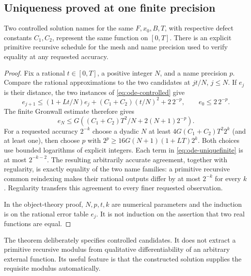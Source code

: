 \subsection{Uniqueness proved at one finite precision}

\begin{theorem}
\label{thm:ode-unique}
Two controlled solution names for the same $F,x_0,B,T$, with respective
defect constants $C_1,C_2$, represent the same function on $[0,T]$.
There is an explicit primitive recursive schedule for the mesh and name
precision used to verify equality at any requested accuracy.
\end{theorem}
\begin{proof}
Fix a rational $t\in[0,T]$, a positive integer $N$, and a name precision
$p$.  Compare the rational approximations to the two candidates at
$jt/N$, $j\le N$.  If $e_j$ is their distance, the two instances of
\eqref{eq:ode-controlled} give
\[
 e_{j+1}\le(1+Lt/N)e_j+(C_1+C_2)(t/N)^2+2\,2^{-p},
 \qquad e_0\le2\,2^{-p}.
\]
The finite Gronwall estimate therefore gives
\begin{equation}
 e_N\le G\left((C_1+C_2)T^2/N+2(N+1)2^{-p}\right).
 \label{eq:ode-uniquefinite}
\end{equation}
For a requested accuracy $2^{-k}$ choose a dyadic $N$ at least
$4G(C_1+C_2)T^2 2^k$ (and at least one), then choose $p$ with
$2^p\ge16G(N+1)(1+LT)2^k$.  Both choices use bounded logarithms of explicit
integers.  Each term in \eqref{eq:ode-uniquefinite} is at most
$2^{-k-2}$.  The resulting arbitrarily accurate agreement, together with
regularity, is exactly equality of the two name families: a primitive
recursive common reindexing makes their rational outputs differ by at
most $2^{-k}$ for every $k$.  Regularity transfers this agreement to every
finer requested observation.

In the object-theory proof, $N,p,t,k$ are numerical parameters and the
induction is on the rational error table $e_j$.  It is not induction on
the assertion that two real functions are equal.
\end{proof}

The theorem deliberately specifies controlled candidates.  It does not
extract a primitive recursive modulus from qualitative differentiability
of an arbitrary external function.  Its useful feature is that the
constructed solution supplies the requisite modulus automatically.

